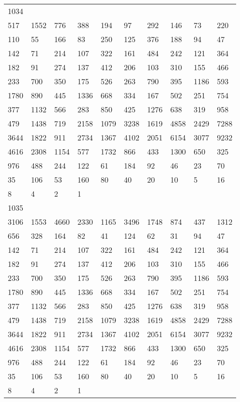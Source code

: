 \begin{longtable}{*{10}{l}}
1034&&&&&&&&&\\
517& 1552& 776& 388& 194& 97& 292& 146& 73& 220\\
110& 55& 166& 83& 250& 125& 376& 188& 94& 47\\
142& 71& 214& 107& 322& 161& 484& 242& 121& 364\\
182& 91& 274& 137& 412& 206& 103& 310& 155& 466\\
233& 700& 350& 175& 526& 263& 790& 395& 1186& 593\\
1780& 890& 445& 1336& 668& 334& 167& 502& 251& 754\\
377& 1132& 566& 283& 850& 425& 1276& 638& 319& 958\\
479& 1438& 719& 2158& 1079& 3238& 1619& 4858& 2429& 7288\\
3644& 1822& 911& 2734& 1367& 4102& 2051& 6154& 3077& 9232\\
4616& 2308& 1154& 577& 1732& 866& 433& 1300& 650& 325\\
976& 488& 244& 122& 61& 184& 92& 46& 23& 70\\
35& 106& 53& 160& 80& 40& 20& 10& 5& 16\\
8& 4& 2& 1& \\

1035&&&&&&&&&\\
3106& 1553& 4660& 2330& 1165& 3496& 1748& 874& 437& 1312\\
656& 328& 164& 82& 41& 124& 62& 31& 94& 47\\
142& 71& 214& 107& 322& 161& 484& 242& 121& 364\\
182& 91& 274& 137& 412& 206& 103& 310& 155& 466\\
233& 700& 350& 175& 526& 263& 790& 395& 1186& 593\\
1780& 890& 445& 1336& 668& 334& 167& 502& 251& 754\\
377& 1132& 566& 283& 850& 425& 1276& 638& 319& 958\\
479& 1438& 719& 2158& 1079& 3238& 1619& 4858& 2429& 7288\\
3644& 1822& 911& 2734& 1367& 4102& 2051& 6154& 3077& 9232\\
4616& 2308& 1154& 577& 1732& 866& 433& 1300& 650& 325\\
976& 488& 244& 122& 61& 184& 92& 46& 23& 70\\
35& 106& 53& 160& 80& 40& 20& 10& 5& 16\\
8& 4& 2& 1& \\


\end{longtable}
